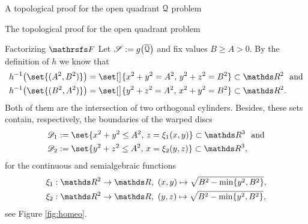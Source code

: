 \documentclass[11pt, a4paper, english, twoside, notitlepage, openright]{report}
\begin{document}
\begin{chapter}{A topological proof for the open quadrant $\mathcal{Q}$ problem}
\begin{section}{The topological proof for the open quadrant problem}
\begin{subsection}{Factorizing $\FFF$}
Let $\mathscr{S}:=g\big(\overline{\mathcal{Q}}\big)$ and fix values $B\ge A>0$. By the definition of $h$ we know that
\begin{align*}
&h^{-1}\big(\set{(A^2,B^2)}\big)=\set[\big]{x^2+y^2=A^2,\,y^2+z^2=B^2}\subset\R^2 \, \, \text{ and}\\
&h^{-1}\big(\set{(B^2,A^2)}\big)=\set[\big]{y^2+z^2=A^2,\,x^2+y^2=B^2}\subset\R^2.
\end{align*} 
Both of them are the intersection of two orthogonal cylinders. Besides, these sets contain, respectively, the boundaries of the warped discs
\begin{align}
&\D_1:= \set{x^2+y^2\le A^2,\,z=\xi_1(x,y)}\subset\R^3 \, \, \text{ and}\label{d1}\\
&\D_2:= \set{y^2+z^2\le A^2,\,x=\xi_2(y,z)}\subset\R^3,\label{d2}
\end{align}
for the continuous and semialgebraic functions
\begin{align}
&\xi_1:\R^2\to\R,\ (x,y)\mapsto\sqrt{B^2-\min\{y^2,B^2\}},\label{xi1}\\
&\xi_2:\R^2\to\R,\ (y,z)\mapsto\sqrt{B^2-\min\{y^2,B^2\}},\label{xi2}
\end{align}
see Figure \ref{fig:homeo}.


\end{subsection}
\end{section}
\end{chapter}
\end{document}
